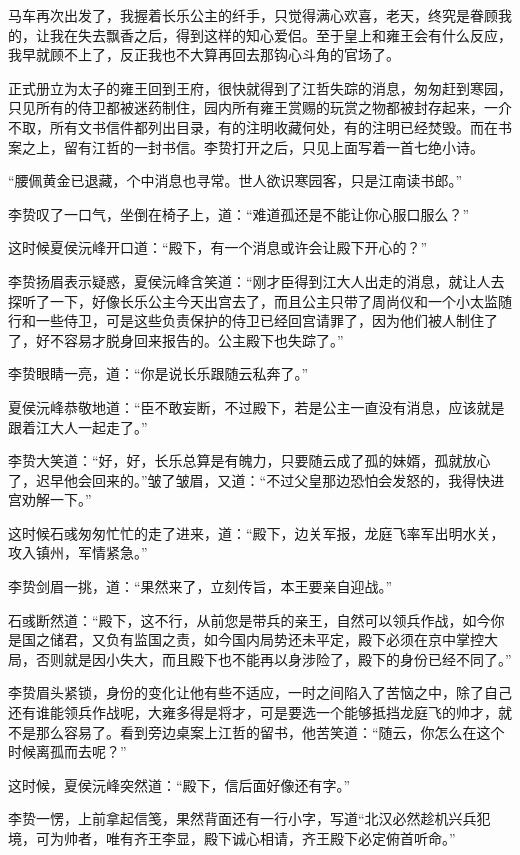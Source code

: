 马车再次出发了，我握着长乐公主的纤手，只觉得满心欢喜，老天，终究是眷顾我的，让我在失去飘香之后，得到这样的知心爱侣。至于皇上和雍王会有什么反应，我早就顾不上了，反正我也不大算再回去那钩心斗角的官场了。

正式册立为太子的雍王回到王府，很快就得到了江哲失踪的消息，匆匆赶到寒园，只见所有的侍卫都被迷药制住，园内所有雍王赏赐的玩赏之物都被封存起来，一介不取，所有文书信件都列出目录，有的注明收藏何处，有的注明已经焚毁。而在书案之上，留有江哲的一封书信。李贽打开之后，只见上面写着一首七绝小诗。

“腰佩黄金已退藏，个中消息也寻常。世人欲识寒园客，只是江南读书郎。”

李贽叹了一口气，坐倒在椅子上，道：“难道孤还是不能让你心服口服么？”

这时候夏侯沅峰开口道：“殿下，有一个消息或许会让殿下开心的？”

李贽扬眉表示疑惑，夏侯沅峰含笑道：“刚才臣得到江大人出走的消息，就让人去探听了一下，好像长乐公主今天出宫去了，而且公主只带了周尚仪和一个小太监随行和一些侍卫，可是这些负责保护的侍卫已经回宫请罪了，因为他们被人制住了了，好不容易才脱身回来报告的。公主殿下也失踪了。”

李贽眼睛一亮，道：“你是说长乐跟随云私奔了。”

夏侯沅峰恭敬地道：“臣不敢妄断，不过殿下，若是公主一直没有消息，应该就是跟着江大人一起走了。”

李贽大笑道：“好，好，长乐总算是有魄力，只要随云成了孤的妹婿，孤就放心了，迟早他会回来的。”皱了皱眉，又道：“不过父皇那边恐怕会发怒的，我得快进宫劝解一下。”

这时候石彧匆匆忙忙的走了进来，道：“殿下，边关军报，龙庭飞率军出明水关，攻入镇州，军情紧急。”

李贽剑眉一挑，道：“果然来了，立刻传旨，本王要亲自迎战。”

石彧断然道：“殿下，这不行，从前您是带兵的亲王，自然可以领兵作战，如今你是国之储君，又负有监国之责，如今国内局势还未平定，殿下必须在京中掌控大局，否则就是因小失大，而且殿下也不能再以身涉险了，殿下的身份已经不同了。”

李贽眉头紧锁，身份的变化让他有些不适应，一时之间陷入了苦恼之中，除了自己还有谁能领兵作战呢，大雍多得是将才，可是要选一个能够抵挡龙庭飞的帅才，就不是那么容易了。看到旁边桌案上江哲的留书，他苦笑道：“随云，你怎么在这个时候离孤而去呢？”

这时候，夏侯沅峰突然道：“殿下，信后面好像还有字。”

李贽一愣，上前拿起信笺，果然背面还有一行小字，写道“北汉必然趁机兴兵犯境，可为帅者，唯有齐王李显，殿下诚心相请，齐王殿下必定俯首听命。”


